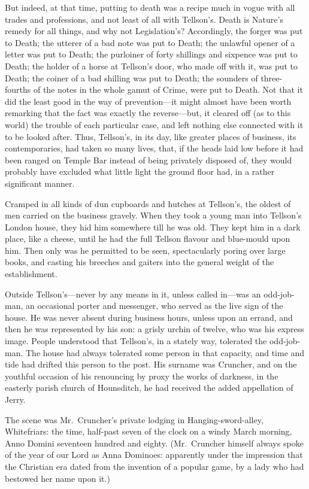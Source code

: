 But indeed, at that time, putting to death was a recipe much in vogue
with all trades and professions, and not least of all with Tellson's.
Death is Nature's remedy for all things, and why not Legislation's?
Accordingly, the forger was put to Death; the utterer of a bad note
was put to Death; the unlawful opener of a letter was put to Death;
the purloiner of forty shillings and sixpence was put to Death; the
holder of a horse at Tellson's door, who made off with it, was put to
Death; the coiner of a bad shilling was put to Death; the sounders of
three-fourths of the notes in the whole gamut of Crime, were put to
Death.  Not that it did the least good in the way of prevention---it
might almost have been worth remarking that the fact was exactly the
reverse---but, it cleared off (as to this world) the trouble of each
particular case, and left nothing else connected with it to be looked
after.  Thus, Tellson's, in its day, like greater places of business,
its contemporaries, had taken so many lives, that, if the heads laid
low before it had been ranged on Temple Bar instead of being
privately disposed of, they would probably have excluded what little
light the ground floor had, in a rather significant manner.

Cramped in all kinds of dun cupboards and hutches at Tellson's, the
oldest of men carried on the business gravely.  When they took a
young man into Tellson's London house, they hid him somewhere till he
was old.  They kept him in a dark place, like a cheese, until he had
the full Tellson flavour and blue-mould upon him.  Then only was he
permitted to be seen, spectacularly poring over large books, and
casting his breeches and gaiters into the general weight of the
establishment.

Outside Tellson's---never by any means in it, unless called in---was an
odd-job-man, an occasional porter and messenger, who served as the
live sign of the house.  He was never absent during business hours,
unless upon an errand, and then he was represented by his son:  a
grisly urchin of twelve, who was his express image.  People
understood that Tellson's, in a stately way, tolerated the
odd-job-man.  The house had always tolerated some person in that
capacity, and time and tide had drifted this person to the post.  His
surname was Cruncher, and on the youthful occasion of his renouncing
by proxy the works of darkness, in the easterly parish church of
Hounsditch, he had received the added appellation of Jerry.

The scene was Mr.\ Cruncher's private lodging in Hanging-sword-alley,
Whitefriars:  the time, half-past seven of the clock on a windy March
morning, Anno Domini seventeen hundred and eighty. (Mr.\ Cruncher
himself always spoke of the year of our Lord as Anna Dominoes:
apparently under the impression that the Christian era dated from the
invention of a popular game, by a lady who had bestowed her name upon it.)

